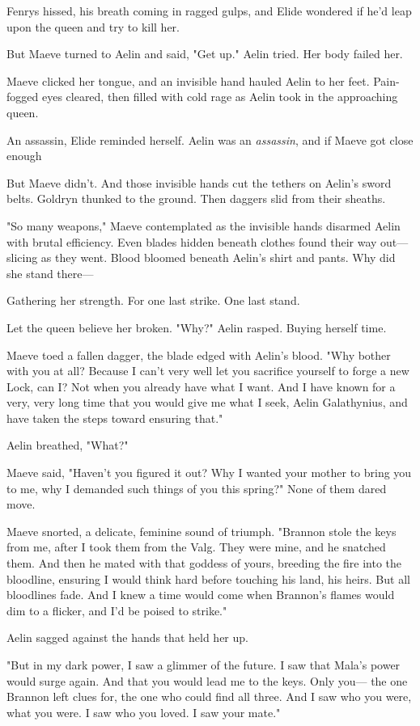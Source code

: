 Fenrys hissed, his breath coming in ragged gulps, and Elide wondered if he'd leap upon the queen and try to kill her.

But Maeve turned to Aelin and said, "Get up."
Aelin tried.
Her body failed her.

Maeve clicked her tongue, and an invisible hand hauled Aelin to her feet.
Pain-fogged eyes cleared, then filled with cold rage as Aelin took in the approaching queen.

An assassin, Elide reminded herself.
Aelin was an \emph{assassin}, and if Maeve got close enough 

But Maeve didn't.
And those invisible hands cut the tethers on Aelin's sword belts.
Goldryn thunked to the ground.
Then daggers slid from their sheaths.

"So many weapons," Maeve contemplated as the invisible hands disarmed Aelin with brutal efficiency.
Even blades hidden beneath clothes found their way out---slicing as they went.
Blood bloomed beneath Aelin's shirt and pants.
Why did she stand there---

Gathering her strength.
For one last strike.
One last stand.

Let the queen believe her broken.
"Why?"
Aelin rasped.
Buying herself time.

Maeve toed a fallen dagger, the blade edged with Aelin's blood.
"Why bother with you at all?
Because I can't very well let you sacrifice yourself to forge a new Lock, can I?
Not when you already have what I want.
And I have known for a very, very long time that you would give me what I seek, Aelin Galathynius, and have taken the steps toward ensuring that."

Aelin breathed, "What?"

Maeve said, "Haven't you figured it out?
Why I wanted your mother to bring you to me, why I demanded such things of you this spring?"
None of them dared move.

Maeve snorted, a delicate, feminine sound of triumph.
"Brannon stole the keys from me, after I took them from the Valg.
They were mine, and he snatched them.
And then he mated with that goddess of yours, breeding the fire into the bloodline, ensuring I would think hard before touching his land, his heirs.
But all bloodlines fade.
And I knew a time would come when Brannon's flames would dim to a flicker, and I'd be poised to strike."

Aelin sagged against the hands that held her up.

"But in my dark power, I saw a glimmer of the future.
I saw that Mala's power would surge again.
And that you would lead me to the keys.
Only you--- the one Brannon left clues for, the one who could find all three.
And I saw who you were, what you were.
I saw who you loved.
I saw your mate."

